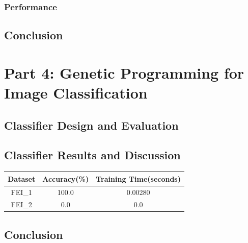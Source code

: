 \documentclass{article}
\begin{document}
\subsubsection*{Performance}
	
\subsection*{Conclusion}

\section*{Part 4: Genetic Programming for Image Classification}
\subsection*{Classifier Design and Evaluation}
\subsection*{Classifier Results and Discussion}
\begin{center}
	\begin{tabular}{|c|c|c|}
		\hline
		Dataset & Accuracy(\%) & Training Time(seconds) \\
		\hline
		FEI\_1 & 100.0 & 0.00280 \\
		\hline
		FEI\_2 & 0.0 & 0.0 \\
		\hline
	\end{tabular}
\end{center}
\subsection*{Conclusion}



\end{document}
